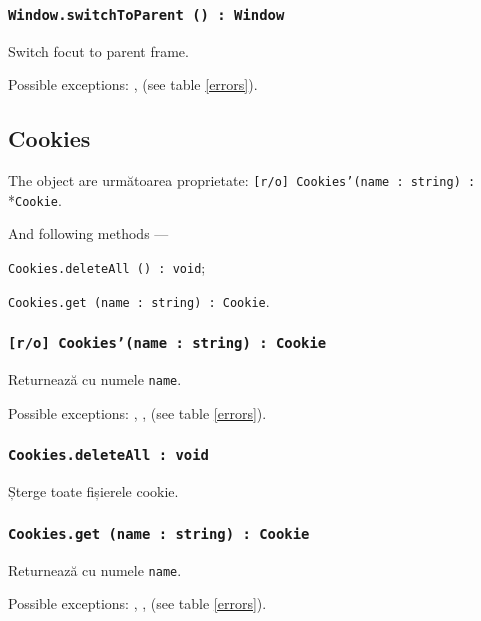 \subsubsection{\texttt{Window.switchToParent () : Window}}

Switch focut to parent frame.

Possible exceptions: ,  (see table \ref{errors}).

\subsection{{\color{orange} Cookies}}

The object \cookies{} are următoarea proprietate: \texttt{[r/o] Cookies'(name : string) :} \\*\texttt{Cookie}.

And following methods — 
\begin{icItems}
	\item \texttt{Cookies.deleteAll () : void};
	\item \texttt{Cookies.get (name : string) : Cookie}.
\end{icItems}

\subsubsection{\texttt{[r/o] Cookies'(name : string) : Cookie}}

Returnează \cookie{} cu numele \texttt{name}.

Possible exceptions: , ,  (see table \ref{errors}).

\subsubsection{\texttt{Cookies.deleteAll : void}}

Șterge toate fișierele cookie.

\subsubsection{\texttt{Cookies.get (name : string) : Cookie}}

Returnează \cookie{} cu numele \texttt{name}.

Possible exceptions: , ,  (see table \ref{errors}).

